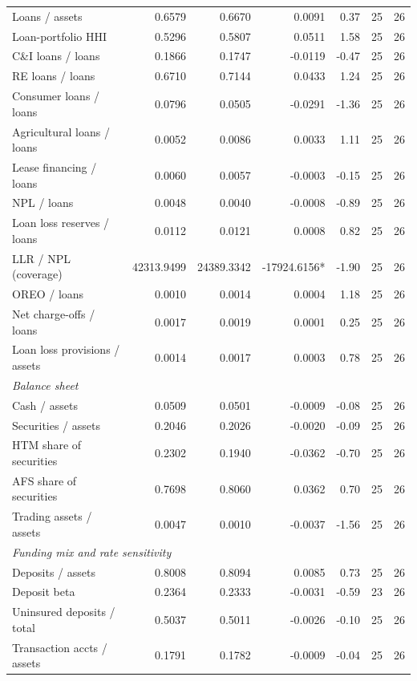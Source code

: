 \begin{tabular}{lrrrrrr}
\midrule
Loans / assets & 0.6579 & 0.6670 & 0.0091 & 0.37 & 25 & 26 \\
Loan-portfolio HHI & 0.5296 & 0.5807 & 0.0511 & 1.58 & 25 & 26 \\
C\&I loans / loans & 0.1866 & 0.1747 & -0.0119 & -0.47 & 25 & 26 \\
RE loans / loans & 0.6710 & 0.7144 & 0.0433 & 1.24 & 25 & 26 \\
Consumer loans / loans & 0.0796 & 0.0505 & -0.0291 & -1.36 & 25 & 26 \\
Agricultural loans / loans & 0.0052 & 0.0086 & 0.0033 & 1.11 & 25 & 26 \\
Lease financing / loans & 0.0060 & 0.0057 & -0.0003 & -0.15 & 25 & 26 \\
NPL / loans & 0.0048 & 0.0040 & -0.0008 & -0.89 & 25 & 26 \\
Loan loss reserves / loans & 0.0112 & 0.0121 & 0.0008 & 0.82 & 25 & 26 \\
LLR / NPL (coverage) & 42313.9499 & 24389.3342 & -17924.6156* & -1.90 & 25 & 26 \\
OREO / loans & 0.0010 & 0.0014 & 0.0004 & 1.18 & 25 & 26 \\
Net charge-offs / loans & 0.0017 & 0.0019 & 0.0001 & 0.25 & 25 & 26 \\
Loan loss provisions / assets & 0.0014 & 0.0017 & 0.0003 & 0.78 & 25 & 26 \\
\midrule
\multicolumn{7}{l}{\emph{Balance sheet}} \\
\midrule
Cash / assets & 0.0509 & 0.0501 & -0.0009 & -0.08 & 25 & 26 \\
Securities / assets & 0.2046 & 0.2026 & -0.0020 & -0.09 & 25 & 26 \\
HTM share of securities & 0.2302 & 0.1940 & -0.0362 & -0.70 & 25 & 26 \\
AFS share of securities & 0.7698 & 0.8060 & 0.0362 & 0.70 & 25 & 26 \\
Trading assets / assets & 0.0047 & 0.0010 & -0.0037 & -1.56 & 25 & 26 \\
\midrule
\multicolumn{7}{l}{\emph{Funding mix and rate sensitivity}} \\
\midrule
Deposits / assets & 0.8008 & 0.8094 & 0.0085 & 0.73 & 25 & 26 \\
Deposit beta & 0.2364 & 0.2333 & -0.0031 & -0.59 & 23 & 26 \\
Uninsured deposits / total & 0.5037 & 0.5011 & -0.0026 & -0.10 & 25 & 26 \\
Transaction accts / assets & 0.1791 & 0.1782 & -0.0009 & -0.04 & 25 & 26 \\

\end{tabular}
